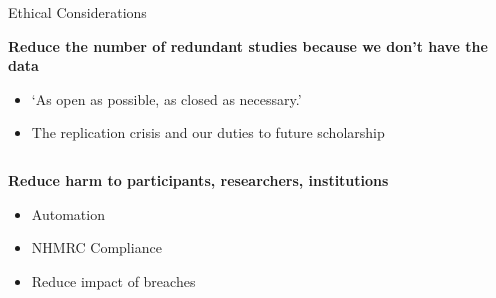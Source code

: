 \documentclass[aspectratio=169, 11pt]{beamer} %
\begin{document}
\begin{frame}{Ethical Considerations}

\textbf{Reduce the number of redundant studies because we don't have the data}
\begin{itemize}
    \item `As open as possible, as closed as necessary.' \parencite{European_Commission2016-ai}
    \item The replication crisis and our duties to future scholarship \parencite{Hochstrasser2020-mr,  National_Academies_of_Sciences_Engineering_and_Medicine2019-da, Reed2014-aa, Franco2014-oy}
    \end{itemize}


\begin{columns}[t]
\begin{column}{.35\textwidth}
\textbf{Reduce harm to participants, researchers, institutions}    
\begin{itemize}
    \item Automation
    \item NHMRC Compliance
    \item Reduce impact of breaches
    

\end{itemize}
\end{column}
\end{columns}
\end{frame}
\end{document}
